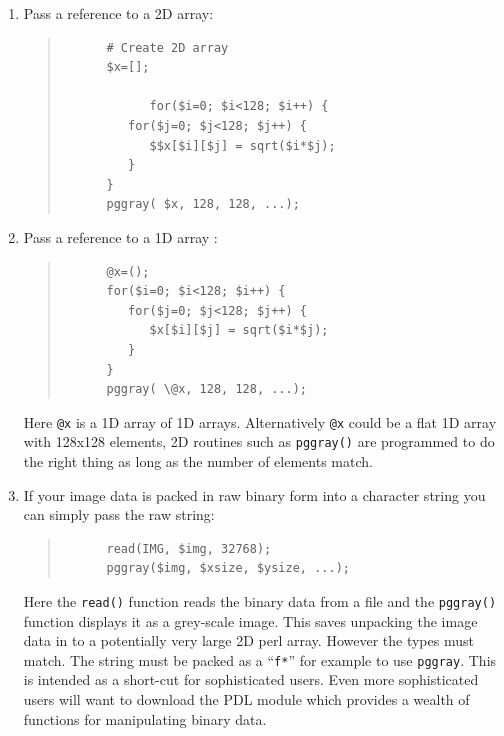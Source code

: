 \documentclass[twoside,11pt]{article}
\begin{document}
\begin{enumerate}
\item Pass a reference to a 2D array:
   \small
   \begin{quote}
   \begin{verbatim}
      # Create 2D array
      $x=[];

            for($i=0; $i<128; $i++) {
         for($j=0; $j<128; $j++) {
            $$x[$i][$j] = sqrt($i*$j);
         }
      }
      pggray( $x, 128, 128, ...);
   \end{verbatim}
   \end{quote}
   \normalsize


\item Pass a reference to a 1D array :
   \small
   \begin{quote}
   \begin{verbatim}
      @x=();
      for($i=0; $i<128; $i++) {
         for($j=0; $j<128; $j++) {
            $x[$i][$j] = sqrt($i*$j);
         }
      }
      pggray( \@x, 128, 128, ...);
   \end{verbatim}
   \end{quote}
   \normalsize

Here {\tt @x} is a 1D array of 1D arrays.  Alternatively {\tt @x}
could be a flat 1D array with 128x128 elements, 2D routines such as
{\tt pggray()} are programmed to do the right thing as long as the
number of elements match.

\item If your image data is packed in raw binary form into a character
string you can simply pass the raw string:

   \small
   \begin{quote}
   \begin{verbatim}
      read(IMG, $img, 32768);
      pggray($img, $xsize, $ysize, ...);
   \end{verbatim}
   \end{quote}
   \normalsize

   Here the {\tt read()} function reads the binary data from a file
   and the {\tt pggray()} function displays it as a grey-scale image.
   This saves unpacking the image data in to a potentially very large
   2D perl array. However the types must match. The string must be
   packed as a ``{\tt f*}'' for example to use {\tt pggray}. This is
   intended as a short-cut for sophisticated users. Even more
   sophisticated users will want to download the PDL module which
   provides a wealth of functions for manipulating binary data.

\end{enumerate}
\end{document}
